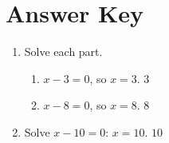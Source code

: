 \documentclass[12pt]{article}
\begin{document}
\section*{Answer Key}

\begin{enumerate}
  \item Solve each part.
  \begin{enumerate}
    \item $x - 3 = 0$, so $x = 3$. $\boxed{3}$
    \item $x - 8 = 0$, so $x = 8$. $\boxed{8}$
  \end{enumerate}
  \item Solve $x - 10 = 0$: $x = 10$. $\boxed{10}$
\end{enumerate}
\end{document}
